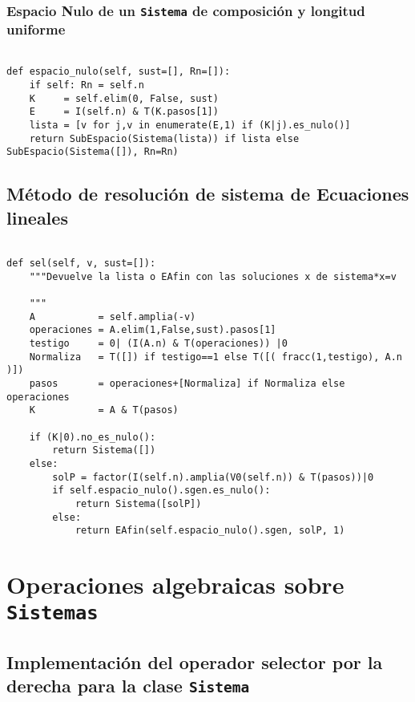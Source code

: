 \documentclass[11pt]{report}
\begin{document}
\subsubsection{Espacio Nulo de un \texttt{Sistema} de composición y longitud uniforme}
\label{sec:org3ba4819}

\begin{verbatim}

def espacio_nulo(self, sust=[], Rn=[]):
    if self: Rn = self.n
    K     = self.elim(0, False, sust)
    E     = I(self.n) & T(K.pasos[1])
    lista = [v for j,v in enumerate(E,1) if (K|j).es_nulo()]
    return SubEspacio(Sistema(lista)) if lista else SubEspacio(Sistema([]), Rn=Rn)

\end{verbatim}

\subsection{Método de resolución de sistema de Ecuaciones lineales}
\label{sec:org97e24db}
\begin{verbatim}

def sel(self, v, sust=[]):
    """Devuelve la lista o EAfin con las soluciones x de sistema*x=v

    """
    A           = self.amplia(-v)
    operaciones = A.elim(1,False,sust).pasos[1]
    testigo     = 0| (I(A.n) & T(operaciones)) |0
    Normaliza   = T([]) if testigo==1 else T([( fracc(1,testigo), A.n )])
    pasos       = operaciones+[Normaliza] if Normaliza else operaciones
    K           = A & T(pasos)
    
    if (K|0).no_es_nulo():
        return Sistema([])
    else:
        solP = factor(I(self.n).amplia(V0(self.n)) & T(pasos))|0
        if self.espacio_nulo().sgen.es_nulo():
            return Sistema([solP])
        else:
            return EAfin(self.espacio_nulo().sgen, solP, 1)

\end{verbatim}

\section{Operaciones algebraicas sobre \texttt{Sistemas}}
\label{sec:orgaf72447}

\subsection{Implementación del operador selector por la derecha para la clase \texttt{Sistema}}
\label{sec:org806d22a}
\end{document}
